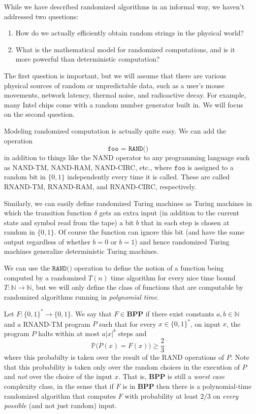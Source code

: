   While we have described randomized algorithms in an informal way, we haven't addressed two questions: 
  \begin{enumerate}
    \item How do we actually efficiently obtain random strings in the physical world? 
    \item What is the mathematical model for randomized computations, and is it more powerful than deterministic computation? 
  \end{enumerate}
  The first question is important, but we will assume that there are various physical sources of random or unpredictable data, such as a user's mouse movements, network latency, thermal noise, and radioactive decay. For example, many Intel chips come with a random number generator built in. We will focus on the second question. 

  Modeling randomized computation is actually quite easy. We can add the operation
  \[\texttt{foo = RAND()}\]
  in addition to things like the NAND operator to any programming language such as NAND-TM, NAND-RAM, NAND-CIRC, etc., where $\texttt{foo}$ is assigned to a random bit in $\{0,1\}$ independently every time it is called. These are called RNAND-TM, RNAND-RAM, and RNAND-CIRC, respectively. 

  Similarly, we can easily define randomized Turing machines as Turing machines in which the transition function $\delta$ gets an extra input (in addition to the current state and symbol read from the tape) a bit $b$ that in each step is chosen at random in $\{0, 1\}$. Of course the function can ignore this bit (and have the same output regardless of whether $b = 0$ or $b= 1$) and hence randomized Turing machines generalize deterministic Turing machines. 

  We can use the $\texttt{RAND()}$ operation to define the notion of a function being computed by a randomized $T(n)$ time algorithm for every nice time bound $T: \mathbb{N} \longrightarrow \mathbb{N}$, but we will only define the class of functions that are computable by randomized algorithms running in \textit{polynomial time}. 

  \begin{definition}
  Let $F: \{0, 1\}^* \longrightarrow \{0,1\}$. We say that $F \in \mathbf{BPP}$ if there exist constants $a, b \in \mathbb{N}$ and a RNAND-TM program $P$ such that for every $x \in \{0,1\}^*$, on input $x$, the program $P$ halts within at most $a |x|^b$ steps and 
  \[\mathbb{P} \big(P(x) = F(x)\big) \geq \frac{2}{3}\]
  where this probabilty is taken over the result of the RAND operations of $P$. Note that this probability is taken only over the random choices in the execution of $P$ and \textit{not} over the choice of the input $x$. That is, \textbf{BPP} is still a \textit{worst case} complexity class, in the sense that if $F$ is in \textbf{BPP} then there is a polynomial-time randomized algorithm that computes $F$ with probability at least $2/3$ on \textit{every possible} (and not just random) input. 
  \end{definition}

